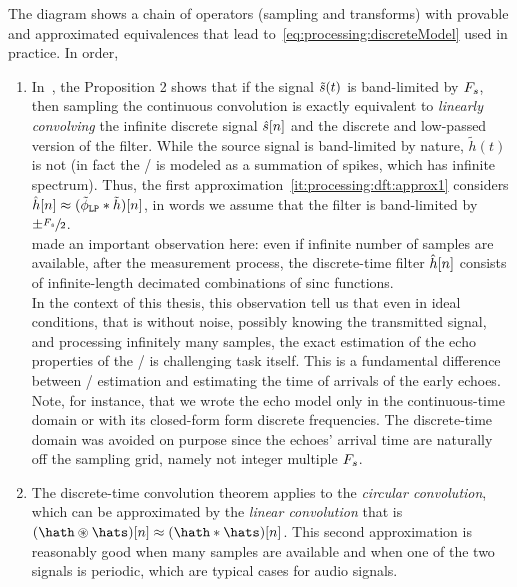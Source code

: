 \begin{figure}[!h]
    \begin{fullwidthfig}
    \centering
    
    \end{fullwidthfig}
\end{figure}

The diagram shows a chain of operators (sampling and transforms) with provable and approximated equivalences that lead to~\cref{eq:processing:discreteModel} used in practice.
In order,
\begin{enumerate}[label=(\roman*)]
    \item\label{it:processing:dft:approx1}
    In~, the Proposition 2 shows that if the signal $\tilde{s}(t)$ is band-limited by $F_s$,
    then sampling the continuous convolution is exactly equivalent to \textit{linearly convolving} the infinite discrete signal $\hat{s}[n]$ and the discrete and low-passed version of the filter.
    While the source signal is band-limited by nature, $\tilde{h}(t)$ is not (in fact the \RIR/ is modeled as a summation of spikes, which has infinite spectrum).
    Thus, the first approximation~\ref{it:processing:dft:approx1} considers $\hat{h}[n] \approx (\lowpassfilter \convDis \tilde{h})[n]$, in words
    we assume that the filter is band-limited by $\pm \sfrac{F_s}{2}$.
    \\\citeauthor{tukuljac2018mulan} made an important observation here:
    even if infinite number of samples are available, after the measurement process, the discrete-time filter $\hat{h}[n]$ consists of infinite-length decimated combinations of sinc functions.
    \\In the context of this thesis, this observation tell us that even in ideal conditions, that is without noise, possibly knowing the transmitted signal, and processing infinitely
    many samples, the exact estimation of the echo properties of the \RIR/ is challenging task itself. This is a fundamental difference between \RIR/ estimation and estimating the
    time of arrivals of the early echoes.
    \\Note, for instance, that we wrote the echo model only in the continuous-time domain or with its closed-form form discrete frequencies.
    The discrete-time domain was avoided on purpose since the echoes' arrival time are naturally off the sampling grid, namely not integer multiple $F_s$.

    \item\label{it:processing:dft:approx2}
    The discrete-time convolution theorem applies to the \textit{circular convolution}, which can be approximated by the \textit{linear convolution}
    that is $(\hath \circledast \hats)[n] \approx (\hath \convDis \hats)[n]$.
    This second approximation is reasonably good when many samples are available and when one of the two signals is periodic, which
    are typical cases for audio signals.


\end{enumerate}
